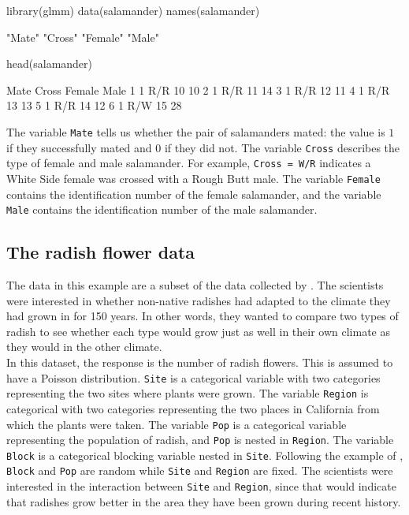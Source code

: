 \documentclass[article]{jss}
\begin{document}
\begin{CodeChunk}
\begin{CodeInput}
library(glmm)
data(salamander)
names(salamander)
\end{CodeInput}
\begin{CodeOutput}
[1] "Mate" "Cross" "Female" "Male"
\end{CodeOutput}
\begin{CodeInput}
head(salamander)
\end{CodeInput}
\begin{CodeOutput}
   Mate Cross Female Male
 1    1   R/R     10   10
 2    1   R/R     11   14
 3    1   R/R     12   11
 4    1   R/R     13   13
 5    1   R/R     14   12
 6    1   R/W     15   28
\end{CodeOutput}
\end{CodeChunk}

The variable \texttt{Mate} tells us whether the pair of salamanders mated: the value is $1$ if they successfully mated and $0$ if they did not. The variable \texttt{Cross} describes the type of female and male salamander. For example, \texttt{Cross = W/R} indicates a White Side female was crossed with a Rough Butt male. The variable \texttt{Female} contains the identification number of the female salamander, and the variable \texttt{Male} contains the identification number of the male salamander.\\ 



\subsection{The radish flower data}

The data in this example are a subset of the data collected by \citet{ridley:ellstrand:2010}. The scientists were interested in whether non-native radishes had adapted to the climate they had  grown in for 150 years. In other words, they wanted to compare two types of radish to see whether each type would grow just as well in their own climate as they would in the other climate. \\

In this dataset, the response is the number of radish flowers. This is assumed to have a Poisson distribution.  \texttt{Site} is a categorical variable with two categories representing the two sites where plants were grown. The variable \texttt{Region} is categorical with two categories representing the two places in California from which the plants were taken. The variable \texttt{Pop} is a categorical variable representing the population of radish, and \texttt{Pop} is nested in \texttt{Region}. The variable \texttt{Block} is a categorical blocking variable nested in \texttt{Site}.  Following the example of \citet{ridley:ellstrand:2010}, \texttt{Block} and \texttt{Pop} are random while \texttt{Site} and \texttt{Region} are fixed. The scientists were interested in  the interaction between \texttt{Site} and \texttt{Region}, since that would indicate that radishes grow better in the area they have been grown during recent history.
\end{document}
